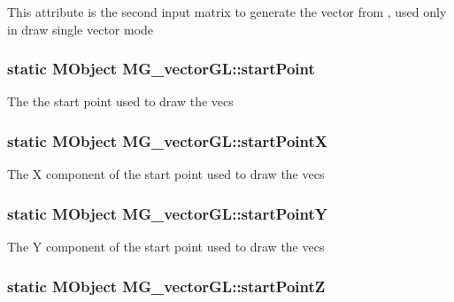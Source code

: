 This attribute is the second input matrix to generate the vector from , used only in draw single vector mode \hypertarget{class_m_g__vector_g_l_ac0ca586f36cae208f5fb0655d5f5a534}{
\subsubsection[{start\-Point}]{\setlength{\rightskip}{0pt plus 5cm}static M\-Object M\-G\-\_\-vector\-G\-L\-::start\-Point\hspace{0.3cm}{\ttfamily [static]}}}\label{class_m_g__vector_g_l_ac0ca586f36cae208f5fb0655d5f5a534}
The the start point used to draw the vecs \hypertarget{class_m_g__vector_g_l_ae7c3a0612e7db7b56e6e96c0179aefc6}{
\subsubsection[{start\-Point\-X}]{\setlength{\rightskip}{0pt plus 5cm}static M\-Object M\-G\-\_\-vector\-G\-L\-::start\-Point\-X\hspace{0.3cm}{\ttfamily [static]}}}\label{class_m_g__vector_g_l_ae7c3a0612e7db7b56e6e96c0179aefc6}
The X component of the start point used to draw the vecs \hypertarget{class_m_g__vector_g_l_af1d06d50730959946fc5db507eefa3aa}{
\subsubsection[{start\-Point\-Y}]{\setlength{\rightskip}{0pt plus 5cm}static M\-Object M\-G\-\_\-vector\-G\-L\-::start\-Point\-Y\hspace{0.3cm}{\ttfamily [static]}}}\label{class_m_g__vector_g_l_af1d06d50730959946fc5db507eefa3aa}
The Y component of the start point used to draw the vecs \hypertarget{class_m_g__vector_g_l_a00e63c6a4cf63e7c71cc22e094578470}{
\subsubsection[{start\-Point\-Z}]{\setlength{\rightskip}{0pt plus 5cm}static M\-Object M\-G\-\_\-vector\-G\-L\-::start\-Point\-Z\hspace{0.3cm}{\ttfamily [static]}}}\label{class_m_g__vector_g_l_a00e63c6a4cf63e7c71cc22e094578470}
